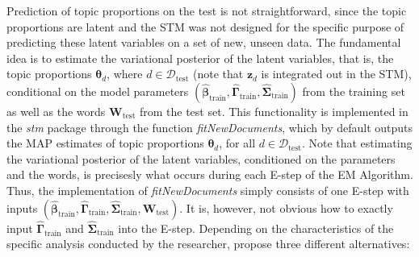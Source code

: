 Prediction of topic proportions on the test is not straightforward, since the topic proportions are latent and the STM was not designed for the specific purpose of predicting these latent variables on a set of new, unseen data. The fundamental idea is to estimate the variational posterior of the latent variables, that is, the topic proportions $\boldsymbol{\theta}_d$, where $d \in \mathcal{D}_{\text{test}}$ (note that $\boldsymbol{z}_d$ is integrated out in the STM), conditional on the model parameters $(\hat{\boldsymbol{\beta}}_{\text{train}}, \hat{\boldsymbol{\Gamma}}_{\text{train}}, \hat{\boldsymbol{\Sigma}}_{\text{train}})$ from the training set as well as the words $\boldsymbol{W}_{\text{test}}$ from the test set. This functionality is implemented in the \textit{stm} package through the function \textit{fitNewDocuments}, which by default outputs the MAP estimates of topic proportions $\boldsymbol{\theta}_d$, for all $d \in \mathcal{D}_{\text{test}}$. Note that estimating the variational posterior of the latent variables, conditioned on the parameters and the words, is precisesly what occurs during each E-step of the EM Algorithm. Thus, the implementation of \textit{fitNewDocuments} simply consists of one E-step with inputs $(\hat{\boldsymbol{\beta}}_{\text{train}}, \hat{\boldsymbol{\Gamma}}_{\text{train}}, \hat{\boldsymbol{\Sigma}}_{\text{train}}, \boldsymbol{W}_{\text{test}})$. It is, however, not obvious how to exactly input $\hat{\boldsymbol{\Gamma}}_{\text{train}}$ and  $\hat{\boldsymbol{\Sigma}}_{\text{train}}$ into the E-step. Depending on the characteristics of the specific analysis conducted by the researcher, \cite{egami2018make} propose three different alternatives:
